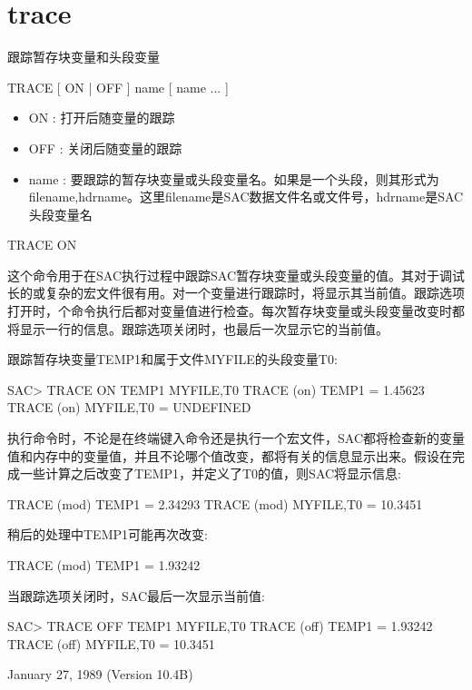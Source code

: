 \section{trace}
\label{cmd:trace}

跟踪暂存块变量和头段变量

TRACE [ ON | OFF ] name [ name ... ]

\begin{itemize}
\item ON : 打开后随变量的跟踪 
\item OFF : 关闭后随变量的跟踪 
\item name : 要跟踪的暂存块变量或头段变量名。如果是一个头段，则其形式为filename,hdrname。这里filename是SAC数据文件名或文件号，hdrname是SAC头段变量名 
\end{itemize}

TRACE ON

这个命令用于在SAC执行过程中跟踪SAC暂存块变量或头段变量的值。其对于调试长的或复杂的宏文件很有用。对一个变量进行跟踪时，将显示其当前值。跟踪选项打开时，个命令执行后都对变量值进行检查。每次暂存块变量或头段变量改变时都将显示一行的信息。跟踪选项关闭时，也最后一次显示它的当前值。

跟踪暂存块变量TEMP1和属于文件MYFILE的头段变量T0:
\begin{SACCode}
SAC> TRACE ON TEMP1 MYFILE,T0
  TRACE  (on) TEMP1 = 1.45623
  TRACE  (on) MYFILE,T0 = UNDEFINED
\end{SACCode}

执行命令时，不论是在终端键入命令还是执行一个宏文件，SAC都将检查新的变量值和内存中的变量值，并且不论哪个值改变，都将有关的信息显示出来。假设在完成一些计算之后改变了TEMP1，并定义了T0的值，则SAC将显示信息:
\begin{SACCode}
  TRACE (mod) TEMP1 = 2.34293
  TRACE (mod) MYFILE,T0 = 10.3451
\end{SACCode}

稍后的处理中TEMP1可能再次改变:
\begin{SACCode}
  TRACE (mod) TEMP1 = 1.93242
\end{SACCode}

当跟踪选项关闭时，SAC最后一次显示当前值:
\begin{SACCode}
SAC> TRACE OFF TEMP1 MYFILE,T0
  TRACE (off) TEMP1 = 1.93242
  TRACE (off) MYFILE,T0 = 10.3451
\end{SACCode}

January 27, 1989 (Version 10.4B)
